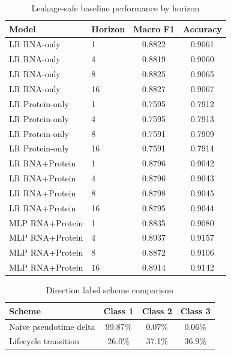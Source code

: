 \documentclass[11pt]{article}
\begin{document}
\begin{table}[H]
\centering
\caption{Leakage-safe baseline performance by horizon}
\label{tab:S3_horizon}
\scriptsize
\setlength{\tabcolsep}{3pt}
\begin{tabular}{llcc}
\toprule
\textbf{Model} & \textbf{Horizon} & \textbf{Macro F1} & \textbf{Accuracy} \\
\midrule
LR RNA-only & 1 & 0.8822 & 0.9061 \\
LR RNA-only & 4 & 0.8819 & 0.9060 \\
LR RNA-only & 8 & 0.8825 & 0.9065 \\
LR RNA-only & 16 & 0.8827 & 0.9067 \\
LR Protein-only & 1 & 0.7595 & 0.7912 \\
LR Protein-only & 4 & 0.7595 & 0.7913 \\
LR Protein-only & 8 & 0.7591 & 0.7909 \\
LR Protein-only & 16 & 0.7591 & 0.7914 \\
LR RNA+Protein & 1 & 0.8796 & 0.9042 \\
LR RNA+Protein & 4 & 0.8796 & 0.9043 \\
LR RNA+Protein & 8 & 0.8798 & 0.9045 \\
LR RNA+Protein & 16 & 0.8795 & 0.9044 \\
MLP RNA+Protein & 1 & 0.8835 & 0.9080 \\
MLP RNA+Protein & 4 & 0.8937 & 0.9157 \\
MLP RNA+Protein & 8 & 0.8872 & 0.9106 \\
MLP RNA+Protein & 16 & 0.8914 & 0.9142 \\
\bottomrule
\end{tabular}
\end{table}

\begin{table}[H]
\centering
\caption{Direction label scheme comparison}
\label{tab:S4_direction}
\small
\begin{tabular}{lccc}
\toprule
\textbf{Scheme} & \textbf{Class 1} & \textbf{Class 2} & \textbf{Class 3} \\
\midrule
Naive pseudotime delta & 99.87\% & 0.07\% & 0.06\% \\
Lifecycle transition & 26.0\% & 37.1\% & 36.9\% \\
\bottomrule
\end{tabular}
\end{table}
\end{document}
